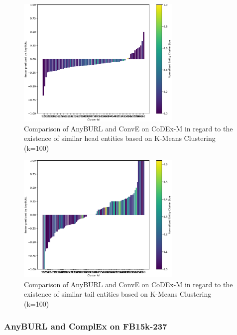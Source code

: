 \begin{figure}[H]
\centering
\includegraphics[width=0.7\textwidth]{images/head_cluster_100_anyburl_rescal_codex.PNG}
\caption{Comparison of AnyBURL and ConvE on CoDEx-M in regard to the existence of similar head entities based on K-Means Clustering (k=100)}
\label{fig:head_cluster_100_anyburl_rescal_codex}
\end{figure}

\begin{figure}[H]
\centering
\includegraphics[width=0.7\textwidth]{images/tail_cluster_100_anyburl_rescal_codex.PNG}
\caption{Comparison of AnyBURL and ConvE on CoDEx-M in regard to the existence of similar tail entities based on K-Means Clustering (k=100)}
\label{fig:tail_cluster_100_anyburl_rescal_codex}
\end{figure}

\subsubsection{AnyBURL and ComplEx on FB15k-237}

